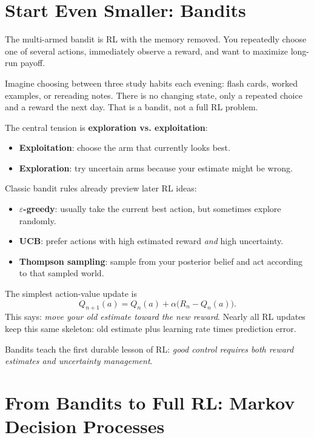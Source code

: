 \documentclass[11pt]{article}
\begin{document}
\section{Start Even Smaller: Bandits}

The multi-armed bandit is RL with the memory removed. You repeatedly choose one of several actions, immediately observe a reward, and want to maximize long-run payoff.

\begin{intuitionbox}
Imagine choosing between three study habits each evening: flash cards, worked examples, or rereading notes. There is no changing state, only a repeated choice and a reward the next day. That is a bandit, not a full RL problem.
\end{intuitionbox}

The central tension is \textbf{exploration vs. exploitation}:

\begin{itemize}
  \item \textbf{Exploitation}: choose the arm that currently looks best.
  \item \textbf{Exploration}: try uncertain arms because your estimate might be wrong.
\end{itemize}

Classic bandit rules already preview later RL ideas:

\begin{itemize}
  \item \textbf{$\varepsilon$-greedy}: usually take the current best action, but sometimes explore randomly.
  \item \textbf{UCB}: prefer actions with high estimated reward \emph{and} high uncertainty.
  \item \textbf{Thompson sampling}: sample from your posterior belief and act according to that sampled world.
\end{itemize}

\begin{mathbox}
The simplest action-value update is
\[
Q_{n+1}(a) = Q_n(a) + \alpha\bigl(R_n - Q_n(a)\bigr).
\]
This says: \emph{move your old estimate toward the new reward}. Nearly all RL updates keep this same skeleton: old estimate plus learning rate times prediction error.
\end{mathbox}

Bandits teach the first durable lesson of RL: \emph{good control requires both reward estimates and uncertainty management}.

\section{From Bandits to Full RL: Markov Decision Processes}
\end{document}
